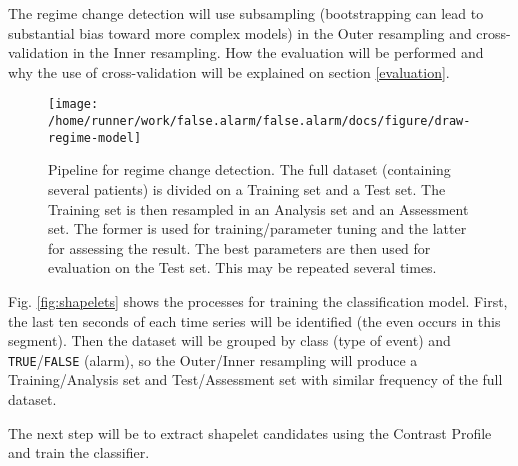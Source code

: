 \documentclass[12pt,twoside]{fmupthesis}
\begin{document}
The regime change detection will use subsampling (bootstrapping can lead to substantial bias toward
more complex models) in the Outer resampling and cross-validation in the Inner resampling. How
the evaluation will be performed and why the use of cross-validation will be explained on section
\ref{evaluation}.
\begin{figure}

{\centering \texttt{[image: /home/runner/work/false.alarm/false.alarm/docs/figure/draw-regime-model]} 

}

\caption{Pipeline for regime change detection. The full dataset (containing several patients) is divided on a Training set and a Test set. The Training set is then resampled in an Analysis set and an Assessment set. The former is used for training/parameter tuning and the latter for assessing the result. The best parameters are then used for evaluation on the Test set. This may be repeated several times.}\label{fig:regimedetection}
\end{figure}
Fig. \ref{fig:shapelets} shows the processes for training the classification model. First, the last
ten seconds of each time series will be identified (the even occurs in this segment). Then the
dataset will be grouped by class (type of event) and \texttt{TRUE}/\texttt{FALSE} (alarm), so the Outer/Inner
resampling will produce a Training/Analysis set and Test/Assessment set with similar frequency of
the full dataset.

The next step will be to extract shapelet candidates using the Contrast Profile and train the
classifier.
\end{document}
